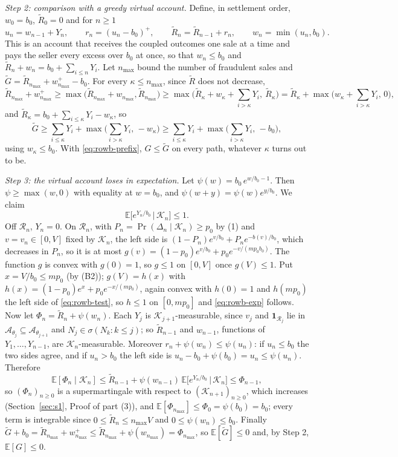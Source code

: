 \documentclass[10pt,a4paper]{article}
\newcommand{\E}{\mathbb{E}}
\newcommand{\cA}{\mathcal{A}}
\newcommand{\cK}{\mathcal{K}}
\newcommand{\cR}{\mathcal{R}}
\newcommand{\one}{\mathbf{1}}
\theoremstyle{plain}
\theoremstyle{remark}
\begin{document}
\emph{Step 2: comparison with a greedy virtual account.} Define, in settlement order, $w_0=b_0$, $\tilde R_0=0$ and for $n\ge1$
\[
u_n=w_{n-1}+Y_n,\qquad r_n=(u_n-b_0)^+,\qquad \tilde R_n=\tilde R_{n-1}+r_n,\qquad w_n=\min(u_n,b_0).
\]
This is an account that receives the coupled outcomes one sale at a time and pays the seller every excess over $b_0$ at once, so that $w_n\le b_0$ and $\tilde R_n+w_n=b_0+\sum_{i\le n}Y_i$. Let $n_{\max}$ bound the number of fraudulent sales and $\tilde G=\tilde R_{n_{\max}}+w_{n_{\max}}^+-b_0$. For every $\kappa\le n_{\max}$, since $\tilde R$ does not decrease,
\[
\tilde R_{n_{\max}}+w_{n_{\max}}^+\ge\max\big(\tilde R_{n_{\max}}+w_{n_{\max}},\tilde R_{n_{\max}}\big)\ge\max\Big(\tilde R_\kappa+w_\kappa+\sum_{i>\kappa}Y_i,\ \tilde R_\kappa\Big)
=\tilde R_\kappa+\max\Big(w_\kappa+\sum_{i>\kappa}Y_i,\,0\Big),
\]
and $\tilde R_\kappa=b_0+\sum_{i\le\kappa}Y_i-w_\kappa$, so
\[
\tilde G\ge\sum_{i\le\kappa}Y_i+\max\Big(\sum_{i>\kappa}Y_i,\,-w_\kappa\Big)\ge\sum_{i\le\kappa}Y_i+\max\Big(\sum_{i>\kappa}Y_i,\,-b_0\Big),
\]
using $w_\kappa\le b_0$. With \eqref{eq:rowb-prefix}, $G\le\tilde G$ on every path, whatever $\kappa$ turns out to be.

\emph{Step 3: the virtual account loses in expectation.} Let $\psi(w)=b_0\,e^{w/b_0-1}$. Then $\psi\ge\max(w,0)$ with equality at $w=b_0$, and $\psi(w+y)=\psi(w)e^{y/b_0}$. We claim
\begin{equation}\label{eq:rowb-exp}
\E\big[e^{Y_n/b_0}\,\big|\,\cK_n\big]\le1 .
\end{equation}
Off $\cR_n$, $Y_n=0$. On $\cR_n$, with $P_n=\Pr(\Delta_n\mid\cK_n)\ge p_0$ by (1) and $v=v_n\in[0,V]$ fixed by $\cK_n$, the left side is $(1-P_n)e^{v/b_0}+P_ne^{-b(v)/b_0}$, which decreases in $P_n$, so it is at most $g(v)=(1-p_0)e^{v/b_0}+p_0e^{-v/(mp_0b_0)}$. The function $g$ is convex with $g(0)=1$, so $g\le1$ on $[0,V]$ once $g(V)\le1$. Put $x=V/b_0\le mp_0$ (by (B2)); $g(V)=h(x)$ with $h(x)=(1-p_0)e^{x}+p_0e^{-x/(mp_0)}$, again convex with $h(0)=1$ and $h(mp_0)$ the left side of \eqref{eq:rowb-test}, so $h\le1$ on $[0,mp_0]$ and \eqref{eq:rowb-exp} follows. Now let $\Phi_n=\tilde R_n+\psi(w_n)$. Each $Y_j$ is $\cK_{j+1}$-measurable, since $v_j$ and $\one_{\cR_j}$ lie in $\cA_{\theta_j}\subseteq\cA_{\theta_{j+1}}$ and $N_j\in\sigma(N_k:k\le j)$; so $\tilde R_{n-1}$ and $w_{n-1}$, functions of $Y_1,\dots,Y_{n-1}$, are $\cK_n$-measurable. Moreover $r_n+\psi(w_n)\le\psi(u_n)$: if $u_n\le b_0$ the two sides agree, and if $u_n>b_0$ the left side is $u_n-b_0+\psi(b_0)=u_n\le\psi(u_n)$. Therefore
\[
\E[\Phi_n\mid\cK_n]\le\tilde R_{n-1}+\psi(w_{n-1})\,\E\big[e^{Y_n/b_0}\,\big|\,\cK_n\big]\le\Phi_{n-1},
\]
so $(\Phi_n)_{n\ge0}$ is a supermartingale with respect to $(\cK_{n+1})_{n\ge0}$, which increases (Section~\ref{sec:s1}, Proof of part (3)), and $\E[\Phi_{n_{\max}}]\le\Phi_0=\psi(b_0)=b_0$; every term is integrable since $0\le\tilde R_n\le n_{\max}V$ and $0\le\psi(w_n)\le b_0$. Finally $\tilde G+b_0=\tilde R_{n_{\max}}+w_{n_{\max}}^+\le\tilde R_{n_{\max}}+\psi(w_{n_{\max}})=\Phi_{n_{\max}}$, so $\E[\tilde G]\le0$ and, by Step 2, $\E[G]\le0$.
\end{document}
